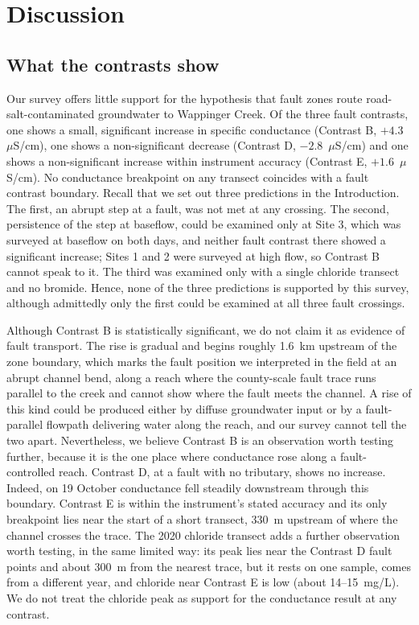 \documentclass{article}
\begin{document}
\section{Discussion}

\subsection{What the contrasts show}\label{sec:disc-contrasts}

Our survey offers little support for the hypothesis that fault zones route road-salt-contaminated groundwater to Wappinger Creek. Of the three fault contrasts, one shows a small, significant increase in specific conductance (Contrast B, $+4.3$~$\mu$S/cm), one shows a non-significant decrease (Contrast D, $-2.8$~$\mu$S/cm) and one shows a non-significant increase within instrument accuracy (Contrast E, $+1.6$~$\mu$S/cm). No conductance breakpoint on any transect coincides with a fault contrast boundary. Recall that we set out three predictions in the Introduction. The first, an abrupt step at a fault, was not met at any crossing. The second, persistence of the step at baseflow, could be examined only at Site 3, which was surveyed at baseflow on both days, and neither fault contrast there showed a significant increase; Sites 1 and 2 were surveyed at high flow, so Contrast B cannot speak to it. The third was examined only with a single chloride transect and no bromide. Hence, none of the three predictions is supported by this survey, although admittedly only the first could be examined at all three fault crossings.

Although Contrast B is statistically significant, we do not claim it as evidence of fault transport. The rise is gradual and begins roughly 1.6~km upstream of the zone boundary, which marks the fault position we interpreted in the field at an abrupt channel bend, along a reach where the county-scale fault trace runs parallel to the creek and cannot show where the fault meets the channel. A rise of this kind could be produced either by diffuse groundwater input or by a fault-parallel flowpath delivering water along the reach, and our survey cannot tell the two apart. Nevertheless, we believe Contrast B is an observation worth testing further, because it is the one place where conductance rose along a fault-controlled reach. Contrast D, at a fault with no tributary, shows no increase. Indeed, on 19 October conductance fell steadily downstream through this boundary. Contrast E is within the instrument's stated accuracy and its only breakpoint lies near the start of a short transect, 330~m upstream of where the channel crosses the trace. The 2020 chloride transect adds a further observation worth testing, in the same limited way: its peak lies near the Contrast D fault points and about 300~m from the nearest trace, but it rests on one sample, comes from a different year, and chloride near Contrast E is low (about 14--15~mg/L). We do not treat the chloride peak as support for the conductance result at any contrast.
\end{document}
